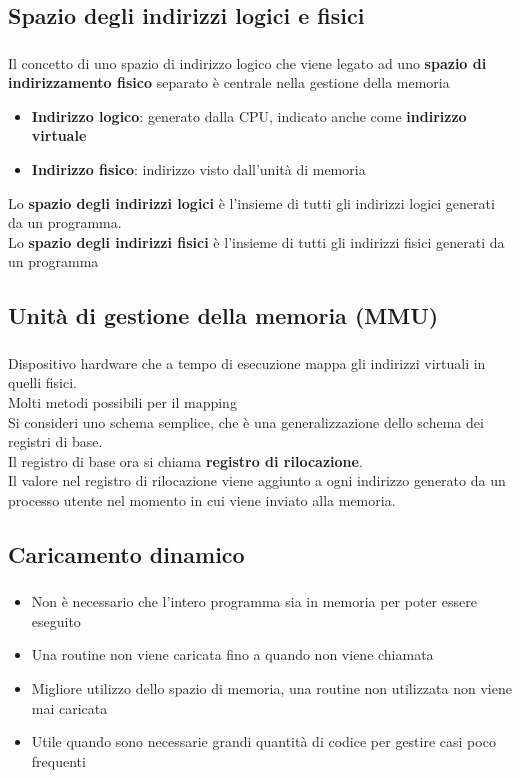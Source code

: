 \documentclass{beamer}
\newenvironment{mainframe}{
	\begin{frame}
		\frametitle{\insertsubsection}
		\framesubtitle{\insertsection}
	}{
	\end{frame}
}
\begin{document}
\subsection{Spazio degli indirizzi logici e fisici}
\begin{mainframe}
	Il concetto di uno spazio di indirizzo logico che viene legato ad uno \textbf{spazio di indirizzamento fisico} separato è centrale nella gestione della memoria
	\begin{itemize}
		\item \textbf{Indirizzo logico}: generato dalla CPU, indicato anche come \textbf{indirizzo virtuale}
		\item \textbf{Indirizzo fisico}: indirizzo visto dall'unità di memoria
	\end{itemize}
	Lo \textbf{spazio degli indirizzi logici} è l'insieme di tutti gli indirizzi logici generati da un programma.\\
	Lo \textbf{spazio degli indirizzi fisici} è l'insieme di tutti gli indirizzi fisici generati da un programma
\end{mainframe}
\subsection{Unità di gestione della memoria (MMU)}
\begin{mainframe}
	Dispositivo hardware che a tempo di esecuzione mappa gli indirizzi virtuali in quelli fisici.\\
	Molti metodi possibili per il mapping\\
	Si consideri uno schema semplice, che è una generalizzazione dello schema dei registri di base.\\
	Il registro di base ora si chiama \textbf{registro di rilocazione}.\\
	Il valore nel registro di rilocazione viene aggiunto a ogni indirizzo generato da un processo utente nel momento in cui viene inviato alla memoria.
\end{mainframe}
\subsection{Caricamento dinamico}
\begin{mainframe}
	\begin{itemize}
		\item Non è necessario che l'intero programma sia in memoria per poter essere eseguito
		\item Una routine non viene caricata fino a quando non viene chiamata
		\item Migliore utilizzo dello spazio di memoria, una routine non utilizzata non viene mai caricata
		\item Utile quando sono necessarie grandi quantità di codice per gestire casi poco frequenti
	\end{itemize}
\end{mainframe}
\end{document}
